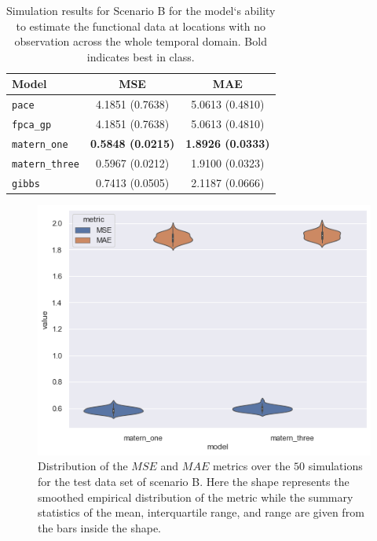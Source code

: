 \begin{table}
	\caption[Simulation results for Scenario B on test data.]{Simulation results for Scenario B for the model`s ability to estimate the functional data at locations with no observation across the whole temporal domain. Bold indicates best in class.}
	\centering
	\label{tab:test_B}
	\begin{tabular}{lcc}
		\toprule
		\textbf{Model} & \textbf{MSE} & \textbf{MAE} \\
		\midrule
		\verb*|pace| & 4.1851 (0.7638) & 5.0613	(0.4810) \\
		\verb*|fpca_gp| & 4.1851 (0.7638) & 5.0613 (0.4810) \\
		\verb*|matern_one| & \textbf{0.5848	(0.0215)} & \textbf{1.8926	(0.0333)} \\
		\verb*|matern_three| & 0.5967 (0.0212) & 1.9100	(0.0323) \\
		\verb*|gibbs| & 0.7413 (0.0505) & 2.1187 (0.0666)\\
		\bottomrule
	\end{tabular}
\end{table}

\begin{figure}
	\centering
	\includegraphics[width=\textwidth]{comp_test_B}
	\caption[Distribution of the $MSE$ and $MAE$ metrics over the $50$ simulations for the test data set of scenario B.]{Distribution of the $MSE$ and $MAE$ metrics over the $50$ simulations for the test data set of scenario B. Here the shape represents the smoothed empirical distribution of the metric while the summary statistics of the mean, interquartile range, and range are given from the bars inside the shape.}
	\label{fig:test_comp_B}
\end{figure}

